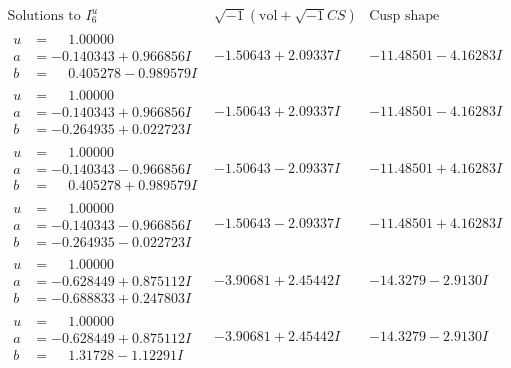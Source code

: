 \documentclass[1p]{elsarticle_modified}
\theoremstyle{definition}
\newcommand{\I}{\sqrt{-1}}
\begin{document}
$$\begin{array}{c|c|c}  
\text{Solutions to }I^u_{6}& \I (\text{vol} + \sqrt{-1}CS) & \text{Cusp shape}\\
 \hline 
\begin{aligned}
u &= \phantom{-}1.00000\phantom{ +0.000000I} \\
a &= -0.140343 + 0.966856 I \\
b &= \phantom{-}0.405278 - 0.989579 I\end{aligned}
 & -1.50643 + 2.09337 I & -11.48501 - 4.16283 I \\ \hline\begin{aligned}
u &= \phantom{-}1.00000\phantom{ +0.000000I} \\
a &= -0.140343 + 0.966856 I \\
b &= -0.264935 + 0.022723 I\end{aligned}
 & -1.50643 + 2.09337 I & -11.48501 - 4.16283 I \\ \hline\begin{aligned}
u &= \phantom{-}1.00000\phantom{ +0.000000I} \\
a &= -0.140343 - 0.966856 I \\
b &= \phantom{-}0.405278 + 0.989579 I\end{aligned}
 & -1.50643 - 2.09337 I & -11.48501 + 4.16283 I \\ \hline\begin{aligned}
u &= \phantom{-}1.00000\phantom{ +0.000000I} \\
a &= -0.140343 - 0.966856 I \\
b &= -0.264935 - 0.022723 I\end{aligned}
 & -1.50643 - 2.09337 I & -11.48501 + 4.16283 I \\ \hline\begin{aligned}
u &= \phantom{-}1.00000\phantom{ +0.000000I} \\
a &= -0.628449 + 0.875112 I \\
b &= -0.688833 + 0.247803 I\end{aligned}
 & -3.90681 + 2.45442 I & -14.3279 - 2.9130 I \\ \hline\begin{aligned}
u &= \phantom{-}1.00000\phantom{ +0.000000I} \\
a &= -0.628449 + 0.875112 I \\
b &= \phantom{-}1.31728 - 1.12291 I\end{aligned}
 & -3.90681 + 2.45442 I & -14.3279 - 2.9130 I \\ \hline\begin{aligned}

\end{aligned}
\end{array}$$
\end{document}
